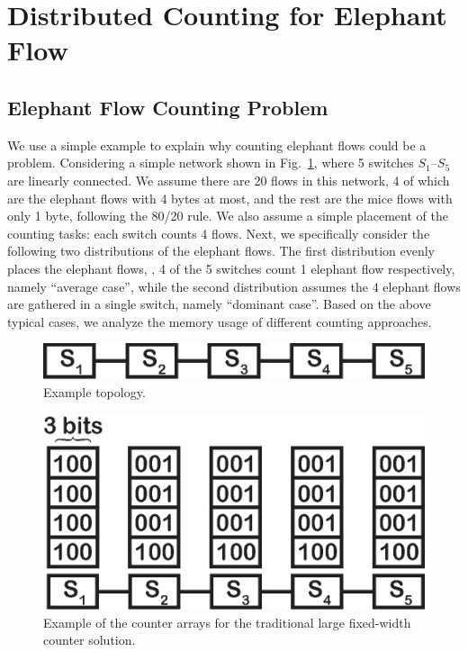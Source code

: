 \section{Distributed Counting for Elephant Flow}\label{sec:to}
\subsection{Elephant Flow Counting Problem}\label{sec:to-prob}
We use a simple example to explain why counting elephant flows could be a problem.
Considering a simple network shown in Fig.~\ref{fig:exam-topo5}, where 5 switches $S_1$--$S_5$ are linearly connected.
We assume there are 20 flows in this network, 4 of which are the elephant flows with 4 bytes at most, and the rest are the mice flows with only 1 byte, following the 80/20 rule.
We also assume a simple placement of the counting tasks: each switch counts 4 flows.
Next, we specifically consider the following two distributions of the elephant flows.
The first distribution evenly places the elephant flows, \eg, 4 of the 5 switches count 1 elephant flow respectively, namely ``average case'', while the second distribution assumes the 4 elephant flows are gathered in a single switch, namely ``dominant case''.
Based on the above typical cases, we analyze the memory usage of different counting approaches.

\begin{figure}[t]
    \centering
    \includegraphics[width=0.6\linewidth]{pic/exam-topo5}
    \caption{Example topology.
    }
    \label{fig:exam-topo5}
    \vspace{-0.1in}
\end{figure}

\begin{figure}[t]
    \centering
    \includegraphics[width=0.6\linewidth]{pic/exam-fixed-width}
    \caption{Example of the counter arrays for the traditional large fixed-width counter solution.
    }
    \label{fig:exam-fixed-width}
    \vspace{-0.1in}
\end{figure}

